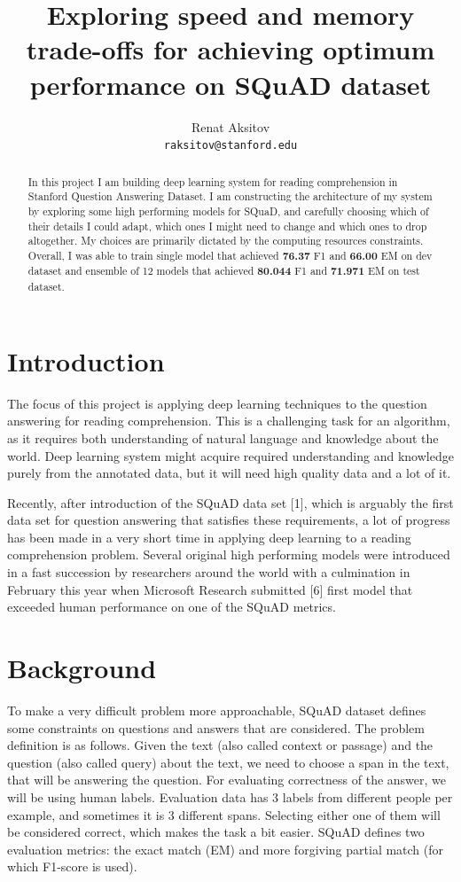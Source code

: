 \documentclass{article}
\title{Exploring speed and memory trade-offs for achieving optimum performance on SQuAD dataset}
\author{
  Renat Aksitov\\
  \texttt{raksitov@stanford.edu} \\
}
\begin{document}
\maketitle
\begin{abstract}
	In this project I am building deep learning system for reading comprehension in Stanford Question Answering Dataset. I am constructing the architecture of my system by exploring some high performing models for SQuaD, and carefully choosing which of their details I could adapt, which ones I might need to change and which ones to drop altogether. My choices are primarily dictated by the computing resources constraints. Overall, I was able to train single model that achieved {\bf 76.37} F1 and {\bf 66.00} EM on dev dataset and ensemble of 12 models that achieved {\bf 80.044} F1 and {\bf 71.971} EM on test dataset.
\end{abstract}

\section{Introduction}
  The focus of this project is applying deep learning techniques to the question answering for reading comprehension. This is a challenging task for an algorithm, as it requires both understanding of natural language and knowledge about the world. Deep learning system might acquire required understanding and knowledge purely from the annotated data, but it will need high quality data and a lot of it.
  
  Recently, after introduction of the SQuAD data set [1], which is arguably the first data set for question answering that satisfies these requirements, a lot of progress has been made in a very short time in applying deep learning to a reading comprehension problem. Several original high performing models were introduced in a fast succession by researchers around the world with a culmination in February this year when Microsoft Research submitted [6] first model that exceeded human performance on one of the SQuAD metrics.

\section{Background}
  To make a very difficult problem more approachable, SQuAD dataset defines some constraints on questions and answers that are considered. The problem definition is as follows. Given the text (also called context or passage) and the question (also called query) about the text, we need to choose a span in the text, that will be answering the question. For evaluating correctness of the answer, we will be using human labels. Evaluation data has 3 labels from different people per example, and sometimes it is 3 different spans. Selecting either one of them will be considered correct, which makes the task a bit easier. SQuAD defines two evaluation metrics: the exact match (EM) and more forgiving partial match (for which F1-score is used).
  
\end{document}
